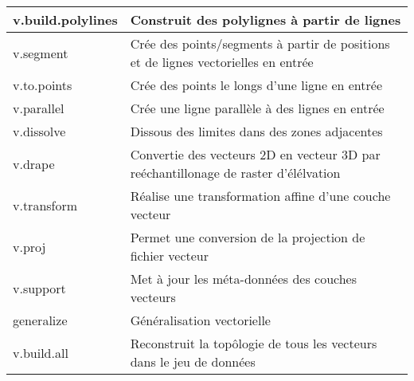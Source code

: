 \begin{center}
{\begin{longtable}{|p{2.5cm}|p{11.5cm}|}
  \hline v.build.polylines & Construit des polylignes à partir de lignes\\
  \hline v.segment & Crée des points/segments à partir de positions et de lignes vectorielles en entrée\\
  \hline v.to.points & Crée des points le longs d'une ligne en entrée\\
  \hline v.parallel & Crée une ligne parallèle à des lignes en entrée\\
  \hline v.dissolve & Dissous des limites dans des zones adjacentes\\
  \hline v.drape & Convertie des vecteurs 2D en vecteur 3D par reéchantillonage de raster d'élélvation\\
  \hline v.transform & Réalise une transformation affine d'une couche vecteur\\
  \hline v.proj & Permet une conversion de la projection de fichier vecteur\\
  \hline v.support & Met à jour les méta-données des couches vecteurs\\
  \hline generalize & Généralisation vectorielle\\
  \hline v.build.all & Reconstruit la top\^ologie de tous les vecteurs dans le jeu de données\\

\end{longtable}}
\end{center}
